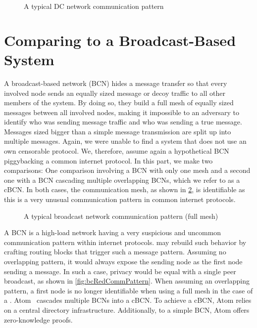 \begin{figure}[ht]\centering
	
	\caption{A typical DC network communication pattern}
	\label{fig:dcCommPattern}
\end{figure}


\section{Comparing \MessageVortex{} to a Broadcast-Based System}
A broadcast-based network (BCN) hides a message transfer so that every involved node sends an equally sized message or decoy traffic to all other members of the system. By doing so, they build a full mesh of equally sized messages between all involved nodes, making it impossible to an adversary to identify who was sending message traffic and who was sending a true message. Messages sized bigger than a simple message transmission are split up into multiple messages. Again, we were unable to find a system that does not use an own censorable protocol. We, therefore, assume again a hypothetical BCN piggybacking a common internet protocol. In this part, we make two comparisons: One comparison involving a BCN with only one mesh and a second one with a BCN cascading multiple overlapping BCNs, which we refer to as a cBCN. In both cases, the communication mesh, as shown in \cref{fig:bcCommPattern}, is identifiable as this is a very unusual communication pattern in common internet protocols.

\begin{figure}[ht]\centering
	
	\caption{A typical broadcast network communication pattern (full mesh)}
	\label{fig:bcCommPattern}
\end{figure}

A BCN is a high-load network having a very suspicious and uncommon communication pattern within internet protocols. \MessageVortex{} may rebuild such behavior by crafting routing blocks that trigger such a message pattern. Assuming no overlapping pattern, it would always expose the sending node as the first node sending a message. In such a case, privacy would be equal with a single peer broadcast, as shown in \cref{fig:bcRedCommPattern}. When assuming an overlapping pattern, a first node is no longer identifiable when using a full mesh in the case of a \VortexMessage{}. Atom~\cite{kwon2016atom} cascades multiple BCNs into a cBCN. To achieve a cBCN, Atom relies on a central directory infrastructure. Additionally, to a simple BCN, Atom offers zero-knowledge proofs.

